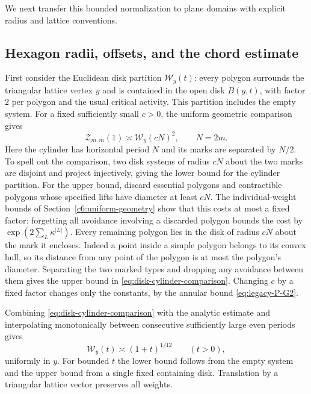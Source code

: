 We next transfer this bounded normalization to plane domains with explicit radius and lattice conventions.

\subsection{Hexagon radii, offsets, and the chord estimate}\label{sec:hexagon-completion}

First consider the Euclidean disk partition $\mathcal W_y(t)$: every polygon surrounds the triangular lattice vertex $y$ and is contained in the open disk $B(y,t)$, with factor $2$ per polygon and the usual critical activity. This partition includes the empty system. For a fixed sufficiently small $c>0$, the uniform geometric comparison gives
\begin{equation}\label{eq:disk-cylinder-comparison}
 \mathcal Z_{m,m}(1)\asymp\mathcal W_y(cN)^2,
 \qquad N=2m.
\end{equation}
Here the cylinder has horizontal period $N$ and its marks are separated by $N/2$. To spell out the comparison, two disk systems of radius $cN$ about the two marks are disjoint and project injectively, giving the lower bound for the cylinder partition. For the upper bound, discard essential polygons and contractible polygons whose specified lifts have diameter at least $cN$. The individual-weight bounds of Section~\ref{c6:uniform-geometry} show that this costs at most a fixed factor: forgetting all avoidance involving a discarded polygon bounds the cost by $\exp(2\sum_L\kappa^{|L|})$. Every remaining polygon lies in the disk of radius $cN$ about the mark it encloses. Indeed a point inside a simple polygon belongs to its convex hull, so its distance from any point of the polygon is at most the polygon's diameter. Separating the two marked types and dropping any avoidance between them gives the upper bound in \eqref{eq:disk-cylinder-comparison}. Changing $c$ by a fixed factor changes only the constants, by the annular bound \eqref{eq:legacy-P-G2}.

Combining \eqref{eq:disk-cylinder-comparison} with the analytic estimate and interpolating monotonically between consecutive sufficiently large even periods gives
\begin{equation}\label{eq:disk-nesting-uniform}
 \mathcal W_y(t)\asymp(1+t)^{1/12}\qquad(t>0),
\end{equation}
uniformly in $y$. For bounded $t$ the lower bound follows from the empty system and the upper bound from a single fixed containing disk. Translation by a triangular lattice vector preserves all weights.

